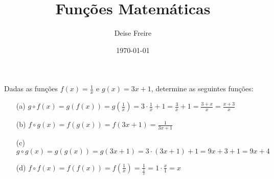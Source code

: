 \documentclass{article} %
\begin{document}
\title{Funções Matemáticas} %
\author{Deise Freire} %
\date{\today} %
\maketitle %
Dadas as funções $f\left( x \right) = \frac{1}{x}$ e $g\left( x \right) = 3x + 1$, determine as seguintes funções:
\begin{enumerate}
    \item[(a)] $g \circ f\left( x \right) = g\left( f\left( x \right)\right) = g\left(\frac{1}{x} \right) = 3 \cdot \frac{1}{x} + 1 = \frac{3}{x} + 1 = \frac{3 + x}{x} = \frac{x + 3}{x}$  

    \item[(b)] $f \circ g\left( x \right) = f\left( g\left( x \right)\right) = f\left( 3x + 1 \right) = \frac{1}{3x + 1}$ 

    \item[(c)] $g \circ g\left( x \right) = g\left(g\left( x \right) \right) = g\left( 3x + 1 \right) = 3 \cdot \left( 3x + 1 \right) + 1 = 9x + 3 + 1 = 9x + 4$

    \item[(d)] $f \circ f\left( x \right) = f\left(f\left( x \right) \right) = f\left( \frac{1}{x} \right) = \frac{1}{\frac{1}{x}} = 1 \cdot \frac{x}{1} = x$ 
\end{enumerate}
\end{document}
